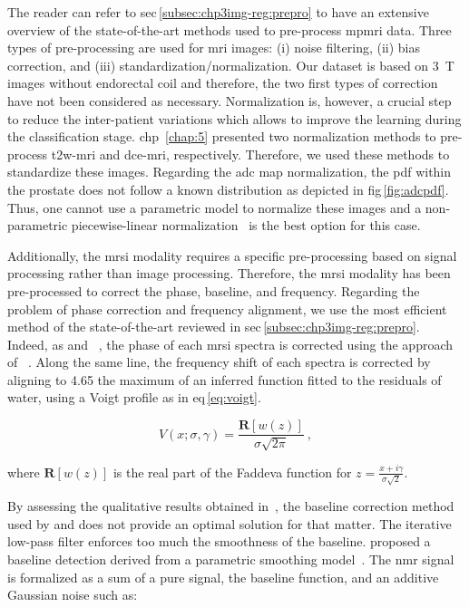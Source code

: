 The reader can refer to \acs{sec}\,\ref{subsec:chp3img-reg:prepro} to have an extensive overview of the state-of-the-art methods used to pre-process \ac{mpmri} data.
Three types of pre-processing are used for \ac{mri} images: (i) noise filtering, (ii) bias correction, and (iii) standardization/normalization.
Our dataset is based on \SI{3}{\tesla} images without endorectal coil and therefore, the two first types of correction have not been considered as necessary.
Normalization is, however, a crucial step to reduce the inter-patient variations which allows to improve the learning during the classification stage.
\Ac{chp}~\ref{chap:5} presented two normalization methods to pre-process \ac{t2w}-\ac{mri} and \ac{dce}-\ac{mri}, respectively.
Therefore, we used these methods to standardize these images.
Regarding the \ac{adc} map normalization, the \ac{pdf} within the prostate does not follow a known distribution as depicted in \acs{fig}\,\ref{fig:adcpdf}.
Thus, one cannot use a parametric model to normalize these images and a non-parametric piecewise-linear normalization~\cite{Nyul2000} is the best option for this case.

Additionally, the \ac{mrsi} modality requires a specific pre-processing based on signal processing rather than image processing.
Therefore, the \ac{mrsi} modality has been pre-processed to correct the phase, baseline, and frequency.
Regarding the problem of phase correction and frequency alignment, we use the most efficient method of the state-of-the-art reviewed in \acs{sec}\,\ref{subsec:chp3img-reg:prepro}.
Indeed, as \citeauthor{Parfait2012} and \citeauthor{trigui2017automatic}~\cite{Parfait2012,trigui2016classification,trigui2017automatic}, the phase of each \ac{mrsi} spectra is corrected using the approach of \citeauthor{Chen2002}~\cite{Chen2002}.
Along the same line, the frequency shift of each spectra is corrected by aligning to \SI{4.65}{\ppm} the maximum of an inferred function fitted to the residuals of water, using a Voigt profile as in \acs{eq}\,\eqref{eq:voigt}.

\begin{equation}
  V(x; \sigma, \gamma) = \frac{\mathbf{R} \left[ w(z) \right]}{\sigma \sqrt{2\pi}} \ ,
  \label{eq:voigt}
\end{equation}

\noindent where $\mathbf{R} \left[ w(z) \right]$ is the real part of the Faddeva function for $z = \frac{x + i \gamma}{\sigma \sqrt{2}}$.

By assessing the qualitative results obtained in~\cite{Parfait2010}, the baseline correction method used by \citeauthor{Parfait2012} and \citeauthor{trigui2017automatic} does not provide an optimal solution for that matter.
The iterative low-pass filter enforces too much the smoothness of the baseline.
\citeauthor{xi2008baseline} proposed a baseline detection derived from a parametric smoothing model~\cite{xi2008baseline}.
The \ac{nmr} signal is formalized as a sum of a pure signal, the baseline function, and an additive Gaussian noise such as:

